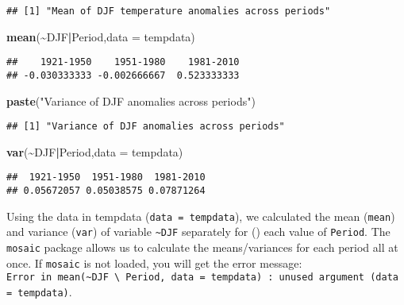 \documentclass[
]{article}
\newenvironment{Shaded}{\begin{snugshade}}{\end{snugshade}}
\newcommand{\AttributeTok}[1]{\textcolor[rgb]{0.13,0.29,0.53}{#1}}
\newcommand{\FunctionTok}[1]{\textcolor[rgb]{0.13,0.29,0.53}{\textbf{#1}}}
\newcommand{\NormalTok}[1]{#1}
\newcommand{\SpecialCharTok}[1]{\textcolor[rgb]{0.81,0.36,0.00}{\textbf{#1}}}
\newcommand{\StringTok}[1]{\textcolor[rgb]{0.31,0.60,0.02}{#1}}
\begin{document}
\begin{verbatim}
## [1] "Mean of DJF temperature anomalies across periods"
\end{verbatim}

\begin{Shaded}
\begin{Highlighting}[]
\FunctionTok{mean}\NormalTok{(}\SpecialCharTok{\textasciitilde{}}\NormalTok{DJF}\SpecialCharTok{|}\NormalTok{Period,}\AttributeTok{data =}\NormalTok{ tempdata)}
\end{Highlighting}
\end{Shaded}

\begin{verbatim}
##    1921-1950    1951-1980    1981-2010 
## -0.030333333 -0.002666667  0.523333333
\end{verbatim}

\begin{Shaded}
\begin{Highlighting}[]
\FunctionTok{paste}\NormalTok{(}\StringTok{"Variance of DJF anomalies across periods"}\NormalTok{)}
\end{Highlighting}
\end{Shaded}

\begin{verbatim}
## [1] "Variance of DJF anomalies across periods"
\end{verbatim}

\begin{Shaded}
\begin{Highlighting}[]
\FunctionTok{var}\NormalTok{(}\SpecialCharTok{\textasciitilde{}}\NormalTok{DJF}\SpecialCharTok{|}\NormalTok{Period,}\AttributeTok{data =}\NormalTok{ tempdata)}
\end{Highlighting}
\end{Shaded}

\begin{verbatim}
##  1921-1950  1951-1980  1981-2010 
## 0.05672057 0.05038575 0.07871264
\end{verbatim}

Using the data in tempdata (\texttt{data\ =\ tempdata}), we calculated
the mean (\texttt{mean}) and variance (\texttt{var}) of variable
\texttt{\textasciitilde{}DJF} separately for (\texttt{\textbar{}}) each
value of \texttt{Period}. The \texttt{mosaic} package allows us to
calculate the means/variances for each period all at once. If
\texttt{mosaic} is not loaded, you will get the error message:
\texttt{Error\ in\ mean(\textasciitilde{}DJF\ \textbackslash{}\textbar{}\ Period,\ data\ =\ tempdata)\ :\ unused\ argument\ (data\ =\ tempdata)}.
\end{document}
